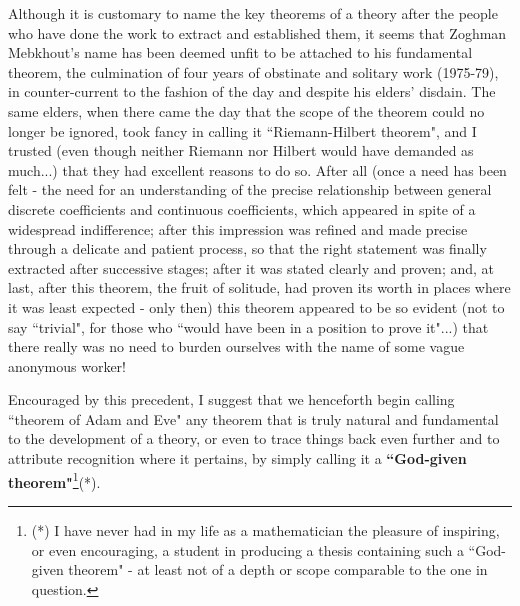 Although it is customary to name the key theorems of a theory after the people who have done the work to extract and established them, it seems that Zoghman Mebkhout's name has been deemed unfit to be attached to his fundamental theorem, the culmination of four years of obstinate and solitary work (1975-79), in counter-current to the fashion of the day and despite his elders' disdain. The same elders, when there came the day that the scope of the theorem could no longer be ignored, took fancy in calling it ``Riemann-Hilbert theorem", and I trusted (even though neither Riemann nor Hilbert would have demanded as much...) that they had excellent reasons to do so. After all (once a need has been felt - the need for an understanding of the precise relationship between general discrete coefficients and continuous coefficients, which appeared in spite of a widespread indifference; after this impression was refined and made precise through a delicate and patient process, so that the right statement was finally extracted after successive stages; after it was stated clearly and proven; and, at last, after this theorem, the fruit of solitude, had proven its worth in places where it was least expected - only then) this theorem appeared to be so evident (not to say ``trivial", for those who ``would have been in a position to prove it"...) that there really was no need to burden ourselves with the name of some vague anonymous worker!

Encouraged by this precedent, I suggest that we henceforth begin calling ``theorem of Adam and Eve" any theorem that is truly natural and fundamental to the development of a theory, or even to trace things back even further and to attribute recognition where it pertains, by simply calling it a \textbf{``God-given theorem"}\footnote{(*) I have never had in my life as a mathematician the pleasure of inspiring, or even encouraging, a student in producing a thesis containing such a ``God-given theorem" - at least not of a depth or scope comparable to the one in question.}(*).

